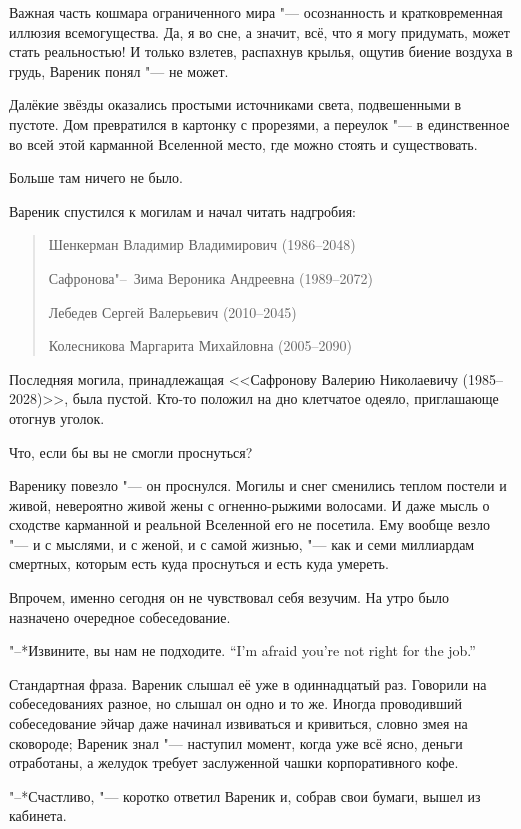 Важная часть кошмара ограниченного мира "--- осознанность и кратковременная иллюзия всемогущества.
Да, я во сне, а значит, всё, что я могу придумать, может стать реальностью!
И только взлетев, распахнув крылья, ощутив биение воздуха в грудь, Вареник понял "--- не может.

Далёкие звёзды оказались простыми источниками света, подвешенными в пустоте.
Дом превратился в картонку с прорезями, а переулок "--- в единственное во всей этой карманной Вселенной место, где можно стоять и существовать.

Больше там ничего не было.

Вареник спустился к могилам и начал читать надгробия:

\begin{quote}
Шенкерман Владимир Владимирович (1986--2048)

Сафронова"--~Зима Вероника Андреевна (1989--2072)

Лебедев Сергей Валерьевич (2010--2045)

Колесникова Маргарита Михайловна (2005--2090)
\end{quote}

Последняя могила, принадлежащая <<Сафронову Валерию Николаевичу (1985--2028)>>, была пустой.
Кто-то положил на дно клетчатое одеяло, приглашающе отогнув уголок.

Что, если бы вы не смогли проснуться?

Варенику повезло "--- он проснулся.
Могилы и снег сменились теплом постели и живой, невероятно живой жены с огненно-рыжими волосами.
И даже мысль о сходстве карманной и реальной Вселенной его не посетила.
Ему вообще везло "--- и с мыслями, и с женой, и с самой жизнью, "--- как и семи миллиардам смертных, которым есть куда проснуться и есть куда умереть.

Впрочем, именно сегодня он не чувствовал себя везучим.
На утро было назначено очередное собеседование.

\asterism

{"--*Извините, вы нам не подходите.}
{``I'm afraid you're not right for the job.''}

Стандартная фраза.
Вареник слышал её уже в одиннадцатый раз.
Говорили на собеседованиях разное, но слышал он одно и то же.
Иногда проводивший собеседование эйчар даже начинал извиваться и кривиться, словно змея на сковороде;
Вареник знал "--- наступил момент, когда уже всё ясно, деньги отработаны, а желудок требует заслуженной чашки корпоративного кофе.

"--*Счастливо, "--- коротко ответил Вареник и, собрав свои бумаги, вышел из кабинета.

